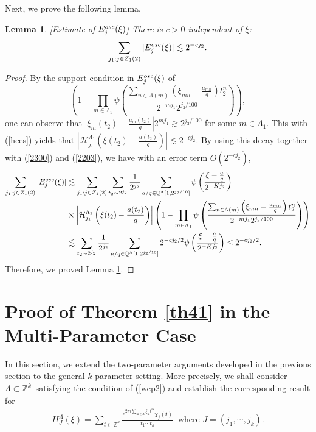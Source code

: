 \documentclass[10pt,a4paper]{amsart}
\newtheorem{lemma}{Lemma}\numberwithin{lemma}{section}
\numberwithin{equation}{section}
\begin{document}
Next, we prove the following lemma.
\begin{lemma}\label{lem574}[Estimate of $E^{\rm{osc}}_j(\xi)$]  There is $c>0$ independent of $\xi$:
$$\sum_{j_1:j\in Z_1(2)} |E^{\rm{osc}}_j(\xi)|\lesssim 2^{-cj_2}.$$
\end{lemma}
\begin{proof}
By  the support condition in  $E^{\rm{osc}}_j(\xi) $ of
$$\left( 1- \prod_{m\in\Lambda_1}\psi\left( \frac{\sum_{n\in\Lambda(m)}\left( \xi_{mn}-\frac{a_{mn}}{q} \right)t_2^n }{2^{-mj_1} 2^{ j_2/100}} \right) \right),$$
one can observe that $  \left|\xi_m(t_2)-\frac{a_m(t_2)}{q}\right|2^{m j_1} \gtrsim 2^{j_2/100}  $ for some $m\in\Lambda_1$. This with (\ref{hees}) yields that
$\left|  \mathcal{H}^{\Lambda_1}_{j_1}\left(\xi(t_2)-\frac{a(t_2)}{q}\right)\right|\lesssim 2^{-cj_2} . $
By using this decay together with  (\ref{2300}) and (\ref{2203}),  we have with an error term $O(2^{-cj_2})$,
\begin{align*} 
\sum_{j_1:j\in Z_1(2)} |E^{\rm{osc}}_{j}(\xi)|
 &\lesssim \sum_{j_1:j\in Z_1(2)} \sum_{t_2\sim 2^{j_2}} \frac{1}{2^{j_2}} \sum_{ a/q\in \mathbb{Q}^{\Lambda}[1,2^{j_2/10}]}   \psi\left(\frac{\xi-\frac{a}{q}}{2^{-Kj_2}}\right)\\
&\times \left| \mathcal{H}^{\Lambda_1}_{j_1}\left(\xi(t_2)-\frac{a(t_2)}{q}\right)\right|\left( 1- \prod_{m\in\Lambda_1}\psi\left( \frac{\sum_{n\in\Lambda(m)}\left( \xi_{mn}-\frac{a_{mn}}{q} \right)t_2^n }{2^{-mj_1} 2^{ j_2/100}} \right) \right)\nonumber\\
&
\lesssim  \sum_{t_2\sim 2^{j_2}} \frac{1}{2^{j_2}} \sum_{ a/q\in \mathbb{Q}^{\Lambda}[1,2^{j_2/10}]}  2^{-cj_2/2}\psi\left(\frac{\xi-\frac{a}{q}}{2^{-Kj_2}}\right)  \le 2^{-cj_2/2}.
\end{align*}
Therefore, we proved Lemma \ref{lem574}.
\end{proof}







\section{Proof of Theorem \ref{th41} in the  Multi-Parameter Case}\label{sec5}
In this section, we extend the two-parameter arguments developed in the previous section to the general $k$-parameter setting. More precisely, we shall consider $\Lambda \subset \mathbb{Z}_{+}^k$ satisfying the condition of (\ref{wep2}) and   establish the corresponding result for
\begin{align*} 
	H^{\Lambda}_J(\xi)= \sum_{t\in \mathbb{Z}^k}  \frac{e^{2\pi i \sum_{\mathfrak{m}\in\Lambda} \xi_{\mathfrak{m}} t^{\mathfrak{m}}}\chi_j(t)}{t_1\cdots t_k} \ \text{ where $J=(j_1,\cdots,j_k)$}.
\end{align*}  
\end{document}
